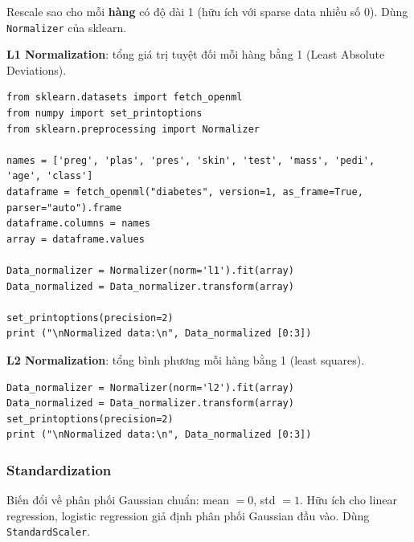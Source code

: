 \begin{ynghia}[title={Normalization}]
Rescale sao cho mỗi \textbf{hàng} có độ dài 1 (hữu ích với sparse data nhiều số 0).
Dùng \texttt{Normalizer} của sklearn.
\end{ynghia}

\textbf{L1 Normalization}: tổng giá trị tuyệt đối mỗi hàng bằng 1 (Least Absolute Deviations).

\begin{vidu}[title={L1}]
\begin{lstlisting}
from sklearn.datasets import fetch_openml
from numpy import set_printoptions
from sklearn.preprocessing import Normalizer

names = ['preg', 'plas', 'pres', 'skin', 'test', 'mass', 'pedi', 'age', 'class']
dataframe = fetch_openml("diabetes", version=1, as_frame=True, parser="auto").frame
dataframe.columns = names
array = dataframe.values

Data_normalizer = Normalizer(norm='l1').fit(array)
Data_normalized = Data_normalizer.transform(array)

set_printoptions(precision=2)
print ("\nNormalized data:\n", Data_normalized [0:3])
\end{lstlisting}
\end{vidu}

\textbf{L2 Normalization}: tổng bình phương mỗi hàng bằng 1 (least squares).

\begin{vidu}[title={L2}]
\begin{lstlisting}
Data_normalizer = Normalizer(norm='l2').fit(array)
Data_normalized = Data_normalizer.transform(array)
set_printoptions(precision=2)
print ("\nNormalized data:\n", Data_normalized [0:3])
\end{lstlisting}
\end{vidu}

\subsubsection{Standardization}

\begin{ynghia}[title={Chuẩn hoá Gaussian}]
Biến đổi về phân phối Gaussian chuẩn: mean $= 0$, std $= 1$.
Hữu ích cho linear regression, logistic regression giả định phân phối Gaussian đầu vào.
Dùng \texttt{StandardScaler}.
\end{ynghia}

